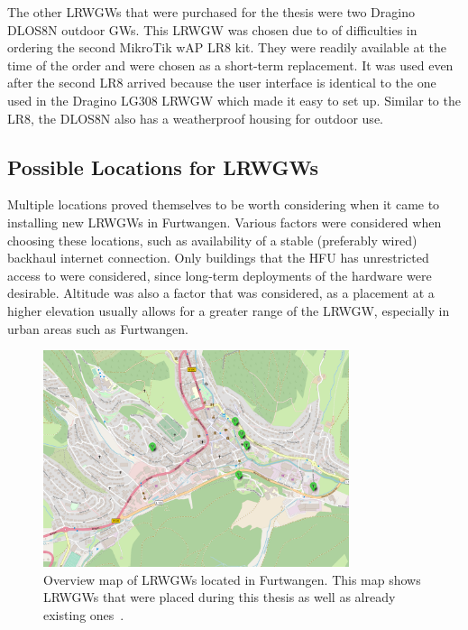 The other \aclp{LRWGW} that were purchased for the thesis were two Dragino DLOS8N outdoor \aclp{GW}.
This \acl{LRWGW} was chosen due to of difficulties in ordering the second MikroTik wAP LR8 kit.
They were readily available at the time of the order and were chosen as a short-term replacement.
It was used even after the second LR8 arrived because the user interface is identical to the one used in the Dragino LG308 \acl{LRWGW} which made it easy to set up.
Similar to the LR8, the DLOS8N also has a weatherproof housing for outdoor use.

\subsection{Possible Locations for \aclp{LRWGW}}\label{sec:gateway-locations}

Multiple locations proved themselves to be worth considering when it came to installing new \aclp{LRWGW} in Furtwangen.
Various factors were considered when choosing these locations, such as availability of a stable (preferably wired) backhaul internet connection.
Only buildings that the \ac{HFU} has unrestricted access to were considered, since long-term deployments of the hardware were desirable.
Altitude was also a factor that was considered, as a placement at a higher elevation usually allows for a greater range of the \acl{LRWGW}, especially in urban areas such as Furtwangen.

\begin{figure}[htbp]
    \centering
    \includegraphics[width=0.8\textwidth]{pictures/hardware/gateway-deployment/gateway_deployment_map.png}
    \caption[Overview map of \aclp{LRWGW} located in Furtwangen]{
        Overview map of \aclp{LRWGW} located in Furtwangen.
        This map shows \aclp{LRWGW} that were placed during this thesis as well as already existing ones~\cite{ttn_mapper_ttn_2023}.
    }\label{pic:gateways-placement-map}
\end{figure}

